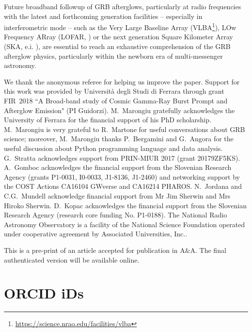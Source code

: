 \documentclass{aa}
\begin{document}
Future broadband followup of GRB afterglows, particularly at radio frequencies with the latest and forthcoming generation facilities -- especially in interferometric mode -- such as the Very Large Baseline Array (VLBA\footnote{\url{https://science.nrao.edu/facilities/vlba}}), LOw Frequency ARray (LOFAR, \citealt{LOFAR13}) or the next generation Square Kilometer Array (SKA, e.i. \citealt{ASKAP}), are essential to reach an exhaustive comprehension of the GRB afterglow physics, particularly within the newborn era of multi-messenger astronomy.


\begin{acknowledgements}

We thank the anonymous referee for helping us improve the paper.
Support for this work was provided by Universit\`a degli Studi di Ferrara through grant FIR~2018 ``A Broad-band study of Cosmic Gamma-Ray Burst Prompt and Afterglow Emission" (PI Guidorzi).
M.~Marongiu gratefully acknowledges the University of Ferrara for the financial support of his PhD scholarship.
M.~Marongiu is very grateful to R.~Martone for useful conversations about GRB science; moreover, M.~Marongiu thanks P.~Bergamini and G.~Angora for the useful discussion about Python programming language and data analysis.
G.~Stratta acknowledges support from PRIN-MIUR 2017 (grant 20179ZF5KS).
A.~Gomboc acknowledges the financial support from the Slovenian Research Agency (grants P1-0031, I0-0033, J1-8136, J1-2460) and networking support by the COST Actions CA16104 GWverse and CA16214 PHAROS.
N.~Jordana and C.G.~Mundell acknowledge financial support from Mr Jim Sherwin and Mrs Hiroko Sherwin.
D.~Kopac acknowledges the financial support from the Slovenian Research Agency (research core funding No. P1-0188).
The National Radio Astronomy Observatory is a facility of the National Science Foundation operated under cooperative agreement by Associated Universities, Inc..

This is a pre-print of an article accepted for publication in A\&A.
The final authenticated version will be available online.

\end{acknowledgements}

\section*{ORCID iDs}
\end{document}
